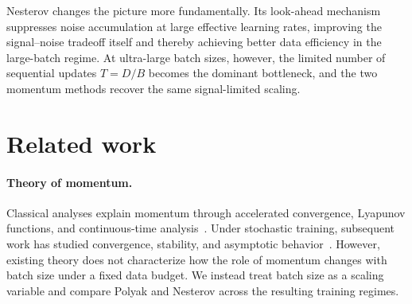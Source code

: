 \documentclass[11pt]{article}
\begin{document}
Nesterov changes the picture more fundamentally. Its look-ahead mechanism suppresses noise accumulation at large effective learning rates, improving the signal--noise tradeoff itself and thereby achieving better data efficiency in the large-batch regime. At ultra-large batch sizes, however, the limited number of sequential updates \(T=D/B\) becomes the dominant bottleneck, and the two momentum methods recover the same signal-limited scaling.

\section{Related work}

\paragraph{Theory of momentum.}
Classical analyses explain momentum through accelerated convergence, Lyapunov functions, and continuous-time analysis~\citep{nesterov1983method,su2016differential,wibisono2016variational,wilson2021lyapunov,shi2022understanding,kovachki2021continuous}. Under stochastic training, subsequent work has studied convergence, stability, and asymptotic behavior~\citep{vidyasagar2025convergence,liu2020improved,yuan2016influence,gitman2019understanding,velikanov2023view,zhang2024optimalityacceleratedsgdhighdimensional}. However, existing theory does not characterize how the role of momentum changes with batch size under a fixed data budget. We instead treat batch size as a scaling variable and compare Polyak and Nesterov across the resulting training regimes.

\vspace{-.5em}
\end{document}
